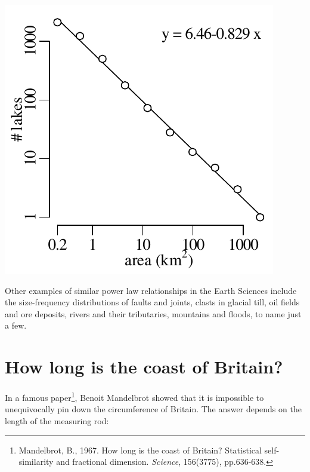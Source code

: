 \noindent\begin{minipage}[t][][b]{.3\textwidth}
  \includegraphics[width=\textwidth]{../figures/Finland.pdf}
\end{minipage}
\begin{minipage}[t][][t]{.7\textwidth}
  \label{fig:Finlandpowerlaw}
\end{minipage}

Other examples of similar power law relationships in the Earth
Sciences include the size-frequency distributions of faults and
joints, clasts in glacial till, oil fields and ore deposits, rivers
and their tributaries, mountains and floods, to name just a few.

\section{How long is the coast of Britain?}
\label{sec:britain}

In a famous paper\footnote{Mandelbrot, B., 1967. How long is the coast
  of Britain? Statistical self-similarity and fractional
  dimension. \textit{Science}, 156(3775), pp.636-638.}, Benoit
Mandelbrot showed that it is impossible to unequivocally pin down the
circumference of Britain. The answer depends on the length of the
measuring rod:\\

